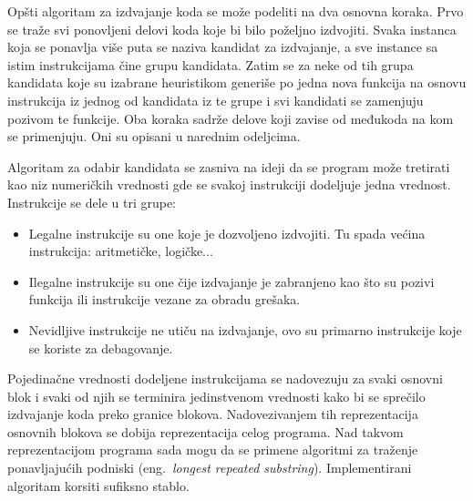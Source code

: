 \documentclass[12pt,oneside]{memoir}
\begin{document}
Opšti algoritam za izdvajanje koda se može podeliti na dva osnovna koraka.
Prvo se traže svi ponovljeni delovi koda koje bi bilo poželjno izdvojiti.
Svaka instanca koja se ponavlja više puta se naziva kandidat za izdvajanje, a sve instance sa istim instrukcijama čine grupu kandidata.
Zatim se za neke od tih grupa kandidata koje su izabrane heuristikom generiše po jedna nova funkcija na osnovu instrukcija iz jednog od kandidata iz te grupe i svi kandidati se zamenjuju pozivom te funkcije.
Oba koraka sadrže delove koji zavise od međukoda na kom se primenjuju. Oni su opisani u narednim odeljcima.

Algoritam za odabir kandidata se zasniva na ideji da se program može tretirati kao niz numeričkih vrednosti
gde se svakoj instrukciji dodeljuje jedna vrednost.
Instrukcije se dele u tri grupe:
\begin{itemize}
  \item Legalne instrukcije su one koje je dozvoljeno izdvojiti. Tu spada većina instrukcija: aritmetičke, logičke...
  \item Ilegalne instrukcije su one čije izdvajanje je zabranjeno kao što su pozivi funkcija ili instrukcije vezane za obradu grešaka.
  \item Nevidljive instrukcije ne utiču na izdvajanje, ovo su primarno instrukcije koje se koriste za debagovanje.
\end{itemize}
Pojedinačne vrednosti dodeljene instrukcijama se nadovezuju za svaki osnovni blok i svaki od njih se terminira jedinstvenom vrednosti kako bi se sprečilo izdvajanje koda preko granice blokova.
Nadovezivanjem tih reprezentacija osnovnih blokova se dobija reprezentacija celog programa.
Nad takvom reprezentacijom programa sada mogu da se primene algoritmi za traženje ponavljajućih podniski (eng.~{\em longest repeated substring}).
Implementirani algoritam korsiti sufiksno stablo.
\end{document}
